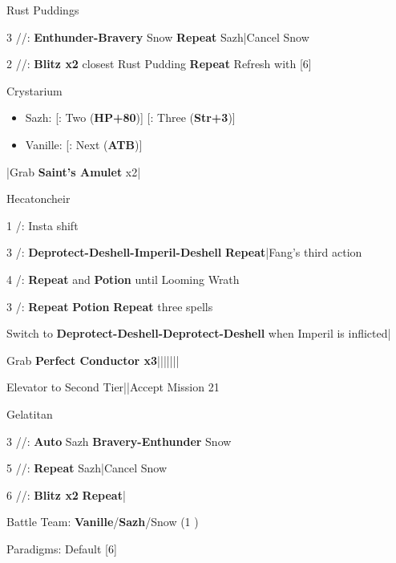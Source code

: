 \begin{fight}{Rust Puddings}
	\item [3] \syn/\med/\com: \textbf{Enthunder-Bravery} Snow \to \textbf{Repeat} Sazh|Cancel Snow
	\item [2] \com/\med/\com: \textbf{Blitz x2} closest Rust Pudding \to \textbf{Repeat} \to Refresh with [6]
\end{fight}
\begin{menu}
	\item Crystarium
	\begin{itemize}
		\item Sazh: [\com: Two (\textbf{HP+80})] [\rav: Three (\textbf{Str+3})]
		\item Vanille: [\med: Next (\textbf{ATB})]
	\end{itemize}
\end{menu}
\begin{mainlist}
	\item \skip|Grab \textbf{Saint's Amulet} x2|\skip
\end{mainlist}
\begin{fight}{Hecatoncheir}
	\item [1] \com/\rav: Insta shift
	\item [3] \sab/\com: \textbf{Deprotect-Deshell-Imperil-Deshell} \to \textbf{Repeat}|Fang's third action
	\item [4] \sab/\sen: \textbf{Repeat} and \textbf{Potion} until Looming Wrath
	\item [3] \sab/\com: \textbf{Repeat} \to \textbf{Potion} \to \textbf{Repeat} three spells
	\item Switch to \textbf{Deprotect-Deshell-Deprotect-Deshell} when Imperil is inflicted|\skip
\end{fight}
\begin{mainlist}
	\item Grab \textbf{Perfect Conductor x3}|\skip||||\skip|\skip|\skip
	\item Elevator to Second Tier|\skip|Accept Mission 21
\end{mainlist}
\begin{fight}{Gelatitan}
	\item [3] \syn/\med/\com: \textbf{Auto} Sazh \to \textbf{Bravery-Enthunder} Snow
	\item [5] \syn/\sab/\com: \textbf{Repeat} Sazh|Cancel Snow
	\item [6] \com/\rav/\com: \textbf{Blitz x2} \to \textbf{Repeat}|\skip
\end{fight}
\begin{menu}
	\item Battle Team: \textbf{Vanille}/\textbf{Sazh}/Snow (1 )
	\item Paradigms: Default [6]
\end{menu}
